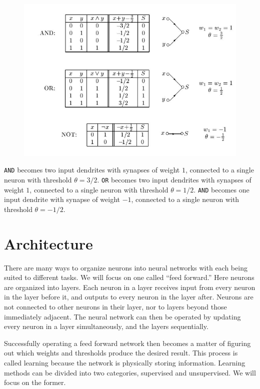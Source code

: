 \documentclass[]{article}
\theoremstyle{plain}
\theoremstyle{definition}
\begin{document}
\begin{figure}[h]
\centering
\includegraphics[scale=1]{CoolenProof.jpg}
\end{figure}

\texttt{AND} becomes two input dendrites with synapses of weight $ 1 $, connected to a single neuron with threshold $ \theta = 3/2 $.
\texttt{OR} becomes two input dendrites with synapses of weight $ 1 $, connected to a single neuron with threshold $ \theta = 1/2 $.
\texttt{AND} becomes one input dendrite with synapse of weight $ -1 $, connected to a single neuron with threshold $ \theta = -1/2 $.

\section{Architecture}
There are many ways to organize neurons into neural networks with each being suited to different tasks. We will focus on one called ``feed forward.'' Here neurons are organized into layers. Each neuron in a layer receives input from every neuron in the layer before it, and outputs to every neuron in the layer after. Neurons are not connected to other neurons in their layer, nor to layers beyond those immediately adjacent. The neural network can then be operated by updating every neuron in a layer simultaneously, and the layers sequentially. 

Successfully operating a feed forward network then becomes a matter of figuring out which weights and thresholds produce the desired result. This process is called learning because the network is physically storing information. Learning methods can be divided into two categories, supervised and unsupervised. We will focus on the former. 
\end{document}
